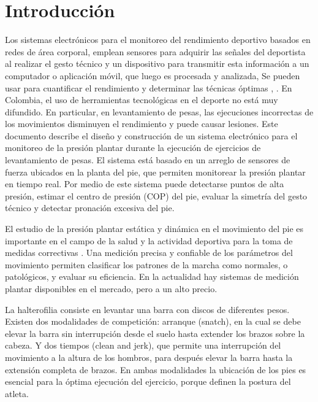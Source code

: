 \chapter{Introducción} \label{sec:Introduccion}
Los sistemas electrónicos para el monitoreo del rendimiento deportivo basados en redes de área corporal, emplean sensores para adquirir las señales del deportista al realizar el gesto técnico y un dispositivo para transmitir esta información a un computador o aplicación móvil, que luego es procesada y analizada, Se pueden usar para cuantificar el rendimiento y determinar las técnicas óptimas \cite{mertz2013technology}, \cite{waltz2015quantified}. En Colombia, el uso de herramientas tecnológicas en el deporte no está muy difundido. En particular, en levantamiento de pesas, las ejecuciones incorrectas de los movimientos disminuyen el rendimiento y puede causar lesiones. Este documento describe el diseño y construcción de un sistema electrónico para el monitoreo de la presión plantar durante la ejecución de ejercicios de levantamiento de pesas. El sistema está basado en un arreglo de sensores de fuerza ubicados en la planta del pie, que permiten monitorear la presión plantar en tiempo real. Por medio de este sistema puede detectarse puntos de alta presión, estimar el centro de presión (COP) del pie, evaluar la simetría del gesto técnico y detectar pronación excesiva del pie.

El estudio de la presión plantar estática y dinámica en el movimiento del pie es importante en el campo de la salud y la actividad deportiva para la toma de medidas correctivas \cite{keijsers2013classification, hills2001plantar, ostadabbas2014knowledge, adelsberger2014effects}. Una medición precisa y confiable de los parámetros del movimiento permiten clasificar los patrones de la marcha como normales, o patológicos, y evaluar su eficiencia. En la actualidad hay sistemas de medición plantar disponibles en el mercado, pero a un alto precio. 

La halterofilia consiste en levantar una barra con discos de diferentes pesos. Existen dos modalidades de competición: arranque (snatch), en la cual se debe elevar la barra sin interrupción desde el suelo hasta extender los brazos sobre la cabeza. Y dos tiempos (clean and jerk), que permite una interrupción del movimiento a la altura de los hombros, para después elevar la barra hasta la extensión completa de brazos. En ambas modalidades la ubicación de los pies es esencial para la óptima ejecución del ejercicio, porque definen la postura del atleta.

